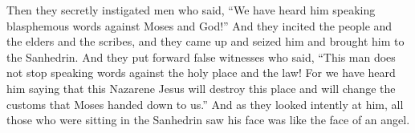 \begin{biblechapter}
\verse Then they secretly instigated men who said, “We have heard him speaking blasphemous words against Moses and God!”
\verse And they incited the people and the elders and the scribes, and they came up and seized him and brought him to the Sanhedrin.
\verse And they put forward false witnesses who said, “This man does not stop speaking words against the holy place and the law!
\verse For we have heard him saying that this Nazarene Jesus will destroy this place and will change the customs that Moses handed down to us.”
\verse And as they looked intently at him, all those who were sitting in the Sanhedrin saw his face was like the face of an angel.
\end{biblechapter}

